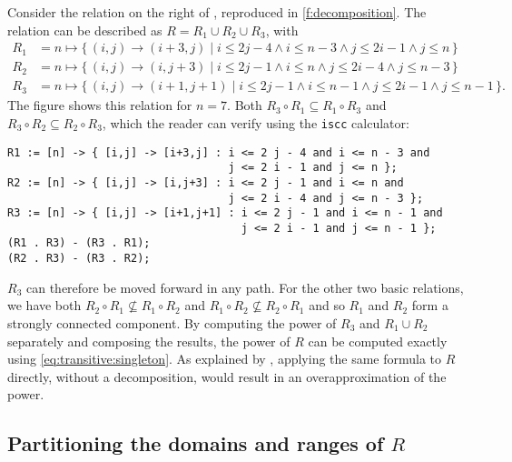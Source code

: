 \begin{example}
\label{ex:decomposition}
Consider the relation on the right of ,
reproduced in \autoref{f:decomposition}.
The relation can be described as $R = R_1 \cup R_2 \cup R_3$,
with
$$
\begin{aligned}
R_1 &= n \mapsto \{\, (i,j) \to (i+3,j) \mid
i \le 2 j - 4 \wedge
i \le n - 3 \wedge
j \le 2 i - 1 \wedge
j \le n \,\}
\\
R_2 &= n \mapsto \{\, (i,j) \to (i,j+3) \mid
i \le 2 j - 1 \wedge
i \le n \wedge
j \le 2 i - 4 \wedge
j \le n - 3 \,\}
\\
R_3 &= n \mapsto \{\, (i,j) \to (i+1,j+1) \mid
i \le 2 j - 1 \wedge
i \le n - 1 \wedge
j \le 2 i - 1 \wedge
j \le n - 1\,\}
.
\end{aligned}
$$
The figure shows this relation for $n = 7$.
Both
$R_3 \circ R_1 \subseteq R_1 \circ R_3$
and
$R_3 \circ R_2 \subseteq R_2 \circ R_3$,
which the reader can verify using the {\tt iscc} calculator:
\begin{verbatim}
R1 := [n] -> { [i,j] -> [i+3,j] : i <= 2 j - 4 and i <= n - 3 and
                                  j <= 2 i - 1 and j <= n };
R2 := [n] -> { [i,j] -> [i,j+3] : i <= 2 j - 1 and i <= n and
                                  j <= 2 i - 4 and j <= n - 3 };
R3 := [n] -> { [i,j] -> [i+1,j+1] : i <= 2 j - 1 and i <= n - 1 and
                                    j <= 2 i - 1 and j <= n - 1 };
(R1 . R3) - (R3 . R1);
(R2 . R3) - (R3 . R2);
\end{verbatim}
$R_3$ can therefore be moved forward in any path.
For the other two basic relations, we have both
$R_2 \circ R_1 \not\subseteq R_1 \circ R_2$
and
$R_1 \circ R_2 \not\subseteq R_2 \circ R_1$
and so $R_1$ and $R_2$ form a strongly connected component.
By computing the power of $R_3$ and $R_1 \cup R_2$ separately
and composing the results, the power of $R$ can be computed exactly
using \eqref{eq:transitive:singleton}.
As explained by , applying the same formula
to $R$ directly, without a decomposition, would result in
an overapproximation of the power.
\end{example}

\subsection{Partitioning the domains and ranges of $R$}

